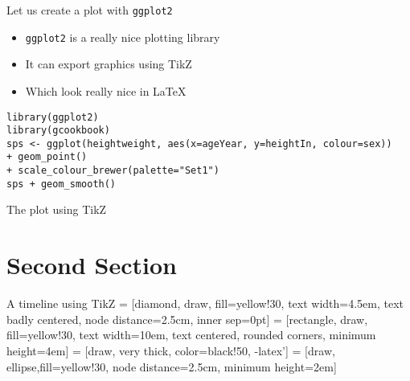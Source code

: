 \documentclass[english,presentation]{pivotalbeamer}
\begin{document}
\begin{frame}[fragile,label=sec-1-3]{Let us create a plot with \texttt{ggplot2}}
 \begin{itemize}
\item \texttt{ggplot2} is a really nice plotting library
\item It can export graphics using TikZ
\item Which look really nice in \LaTeX
\end{itemize}

\begin{verbatim}
library(ggplot2)
library(gcookbook)
sps <- ggplot(heightweight, aes(x=ageYear, y=heightIn, colour=sex))
+ geom_point()
+ scale_colour_brewer(palette="Set1")
sps + geom_smooth()
\end{verbatim}
\end{frame}

\begin{frame}[fragile,label=sec-1-4]{The plot using TikZ}
\begin{centering}
\scriptsize{}
\end{centering}
\end{frame}

\section{Second Section}
\label{sec-2}
\begin{frame}[fragile,label=sec-2-1]{A timeline using TikZ}
 = [diamond, draw, fill=yellow!30,
    text width=4.5em, text badly centered, node distance=2.5cm, inner sep=0pt]
 = [rectangle, draw, fill=yellow!30,
    text width=10em, text centered, rounded corners, minimum height=4em]
 = [draw, very thick, color=black!50, -latex']
 = [draw, ellipse,fill=yellow!30, node distance=2.5cm,
    minimum height=2em]
\end{frame}
\end{document}
